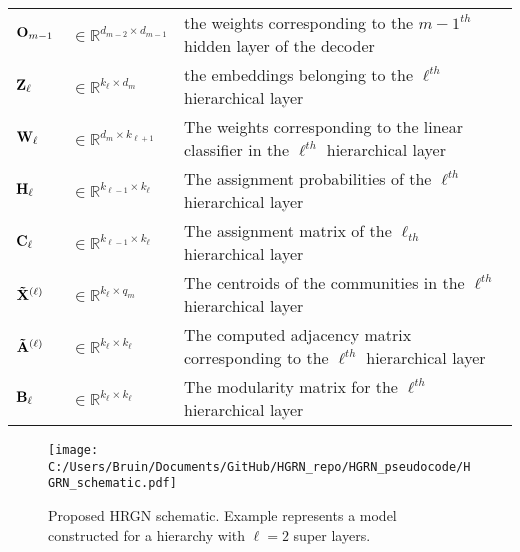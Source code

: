 \documentclass[a4paper,12pt]{article}
\begin{document}
\begin{table}[!ht]
\begin{tabular}{p{2cm}|p{3cm}|p{10cm}}
		${\bf O}_{m-1}$ & $\in \mathbb{R}^{d_{m-2}\times d_{m-1}}$ & the weights corresponding to the ${m-1}^{th}$ hidden layer of the decoder \\
		
		${\bf Z}_{\ell}$ & $\in\mathbb{R}^{k_\ell \times d_m}$ & the embeddings belonging to the $\ell^{th}$ hierarchical layer \\
		
		${\bf W}_\ell$ & $\in\mathbb{R}^{d_m \times k_{\ell + 1}}$ & The weights corresponding to the linear classifier in the $\ell^{th}$ hierarchical layer\\
		
		${\bf H}_\ell$ & $\in\mathbb{R}^{k_{\ell-1} \times k_\ell}$ & The assignment probabilities of the $\ell^{th}$ hierarchical layer \\
		
		${\bf C}_\ell$ & $\in\mathbb{R}^{k_{\ell-1} \times k_\ell}$ & The assignment matrix of the $\ell_{th}$ hierarchical layer \\
		
		${\bf \tilde X}^{(\ell)}$ & $\in\mathbb{R}^{k_\ell \times q_m}$& The centroids of the communities in the $\ell^{th}$ hierarchical layer \\
		
		${\bf \tilde A}^{(\ell)}$ & $\in\mathbb{R}^{k_\ell \times k_\ell}$& The computed adjacency matrix corresponding to the $\ell^{th}$ hierarchical layer \\
		
		${\bf B}_\ell$ & $\in\mathbb{R}^{k_\ell \times k_\ell}$ & The modularity matrix for the $\ell^{th}$ hierarchical layer \\
		
		\bottomrule[0.08cm]
	\end{tabular}
\end{table}

\newpage

\begin{figure}
	\caption[HGRN schematic]{Proposed HRGN schematic. Example represents a model constructed for a hierarchy with $\ell = 2$ super layers.}
	\texttt{[image: C:/Users/Bruin/Documents/GitHub/HGRN\_repo/HGRN\_pseudocode/HGRN\_schematic.pdf]}
\end{figure}
	
	
	
	
	
	
	
	
	
	
	
	
	
	
	
	
	
	
	
	
	
	
	
	
	
	
	
	
	
	
	
	
	
	
	
	\clearpage
	\newpage
	
	
	
	
	
	
	
	
	
\end{document}
